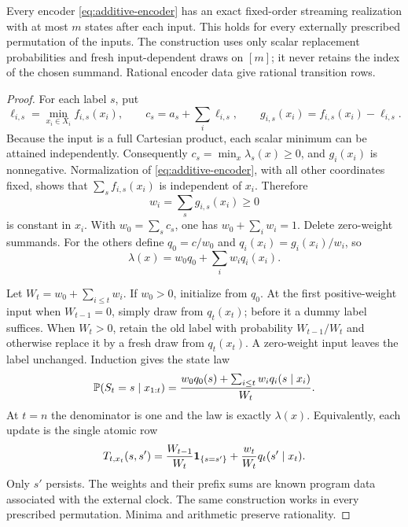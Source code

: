 \begin{theorem}
\label{thm:additive}
Every encoder \eqref{eq:additive-encoder} has an exact fixed-order
streaming realization with at most $m$ states after each input. This
holds for every externally prescribed permutation of the inputs.
The construction uses only scalar replacement probabilities and fresh
input-dependent draws on $[m]$; it never retains the index of the chosen
summand. Rational encoder data give rational transition rows.
\end{theorem}
\begin{proof}
For each label $s$, put
\[
 \ell_{i,s}=\min_{x_i\in X_i} f_{i,s}(x_i),\qquad
 c_s=a_s+\sum_i\ell_{i,s},\qquad
 g_{i,s}(x_i)=f_{i,s}(x_i)-\ell_{i,s}.
\]
Because the input is a full Cartesian product, each scalar minimum can
be attained independently. Consequently
$c_s=\min_x\lambda_s(x)\ge0$, and $g_i(x_i)$ is nonnegative.
Normalization of \eqref{eq:additive-encoder}, with all other coordinates
fixed, shows that $\sum_s f_{i,s}(x_i)$ is independent of $x_i$.
Therefore
\[
 w_i=\sum_sg_{i,s}(x_i)\ge0
\]
is constant in $x_i$. With $w_0=\sum_sc_s$, one has
$w_0+\sum_iw_i=1$. Delete zero-weight summands. For the others define
$q_0=c/w_0$ and $q_i(x_i)=g_i(x_i)/w_i$, so
\begin{equation}\label{eq:mixture-decomposition}
             \lambda(x)=w_0q_0+\sum_iw_iq_i(x_i).
\end{equation}

Let $W_t=w_0+\sum_{i\le t}w_i$. If $w_0>0$, initialize from $q_0$.
At the first positive-weight input when $W_{t-1}=0$, simply draw from
$q_t(x_t)$; before it a dummy label suffices. When $W_t>0$, retain the
old label with probability $W_{t-1}/W_t$ and otherwise replace it by
a fresh draw from $q_t(x_t)$. A zero-weight input leaves the label
unchanged. Induction gives the state law
\[
 \mathbb P(S_t=s\mid x_{1:t})
 =\frac{w_0q_0(s)+\sum_{i\le t}w_iq_i(s\mid x_i)}{W_t}.
\]
At $t=n$ the denominator is one and the law is exactly $\lambda(x)$.
Equivalently, each update is the single atomic row
\begin{equation}\label{eq:additive-transition}
 T_{t,x_t}(s,s')=\frac{W_{t-1}}{W_t}\mathbf1_{\{s=s'\}}
                   +\frac{w_t}{W_t}q_t(s'\mid x_t).
\end{equation}
Only $s'$ persists. The weights and their prefix sums are known program
data associated with the external clock. The same construction works
in every prescribed permutation. Minima and arithmetic preserve
rationality.
\end{proof}


